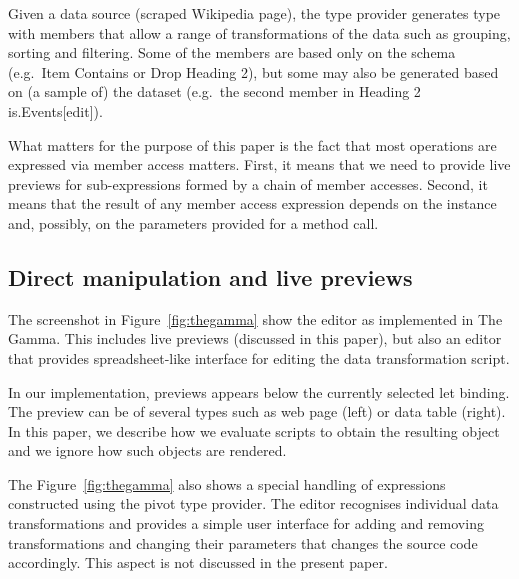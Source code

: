 \documentclass[sigplan,10pt,review,anonymous]{acmart}\settopmatter{printfolios=true,printccs=false,printacmref=false}
\theoremstyle{plain}
\theoremstyle{definition}
\newcommand{\ident}[1]{\textnormal{\sffamily #1}}
\begin{document}
Given a data source (scraped Wikipedia page), the type provider generates type with members that allow
a range of transformations of the data such as grouping, sorting and filtering. Some of the members
are based only on the schema (e.g.~\ident{\textquotesingle Item Contains\textquotesingle} or 
\ident{\textquotesingle Drop Heading 2\textquotesingle}), but some may also be generated based
on (a sample of) the dataset (e.g.~the second member in \ident{\textquotesingle Heading 2 
is\textquotesingle.\textquotesingle Events[edit]\textquotesingle}). 

What matters for the purpose of this paper is 
the fact that most operations are expressed via member access matters. First, it means 
that we need to provide live previews for sub-expressions formed by a chain of member accesses.
Second, it means that the result of any member access expression depends on the instance and,
possibly, on the parameters provided for a method call.

\subsection{Direct manipulation and live previews}
The screenshot in Figure~\ref{fig:thegamma} show the editor as implemented in The Gamma. This
includes live previews (discussed in this paper), but also an editor that provides spreadsheet-like
interface for editing the data transformation script.

In our implementation, previews appears below the currently selected let binding.
The preview can be of several types such as web page (left) or data table (right). In this paper,
we describe how we evaluate scripts to obtain the resulting object and we ignore how such objects
are rendered.

The Figure~\ref{fig:thegamma} also shows a special handling of expressions constructed using the
pivot type provider. The editor recognises individual data transformations and provides a simple
user interface for adding and removing transformations and changing their parameters that changes
the source code accordingly. This aspect is not discussed in the present paper. 

\end{document}
